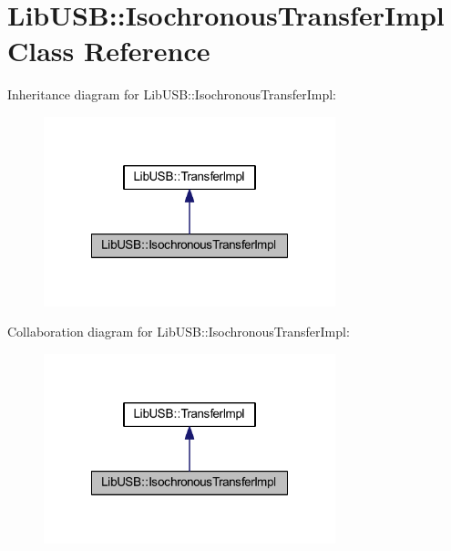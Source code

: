 \hypertarget{class_lib_u_s_b_1_1_isochronous_transfer_impl}{\section{Lib\-U\-S\-B\-:\-:Isochronous\-Transfer\-Impl Class Reference}
\label{class_lib_u_s_b_1_1_isochronous_transfer_impl}
}


Inheritance diagram for Lib\-U\-S\-B\-:\-:Isochronous\-Transfer\-Impl\-:
\nopagebreak
\begin{figure}[H]
\begin{center}
\leavevmode
\includegraphics[width=240pt]{class_lib_u_s_b_1_1_isochronous_transfer_impl__inherit__graph}
\end{center}
\end{figure}


Collaboration diagram for Lib\-U\-S\-B\-:\-:Isochronous\-Transfer\-Impl\-:
\nopagebreak
\begin{figure}[H]
\begin{center}
\leavevmode
\includegraphics[width=240pt]{class_lib_u_s_b_1_1_isochronous_transfer_impl__coll__graph}
\end{center}
\end{figure}
